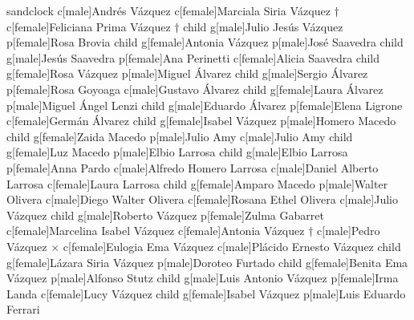 \documentclass{standalone}
\begin{document}
\begin{genealogypicture}
sandclock{%
    c[male]{Andrés Vázquez}
    c[female]{Marciala Siria Vázquez $\dagger$}
    c[female]{Feliciana Prima Vázquez $\dagger$}
    child{%
        g[male]{Julio Jesús Vázquez}
        p[female]{Rosa Brovia}
        child{%
            g[female]{Antonia Vázquez}
            p[male]{José Saavedra}
            child{%
                g[male]{Jesús Saavedra}
                p[female]{Ana Perinetti}
                c[female]{Alicia Saavedra}
            }
        }
        child{%
            g[female]{Rosa Vázquez}
            p[male]{Miguel Álvarez}
            child{%
                g[male]{Sergio Álvarez}
                p[female]{Rosa Goyoaga}
                c[male]{Gustavo Álvarez}
                child{%
                    g[female]{Laura Álvarez}
                    p[male]{Miguel Ángel Lenzi}
                }
            }
            child{%
                g[male]{Eduardo Álvarez}
                p[female]{Elena Ligrone}
                c[female]{Germán Álvarez}
            }
        }
        child{%
            g[female]{Isabel Vázquez}
            p[male]{Homero Macedo}
            child{%
                g[female]{Zaida Macedo}
                p[male]{Julio Amy}
                c[male]{Julio Amy}
            }
            child{%
                g[female]{Luz Macedo}
                p[male]{Elbio Larrosa}
                child{%
                    g[male]{Elbio Larrosa}
                    p[female]{Anna Pardo}
                }
                c[male]{Alfredo Homero Larrosa}
                c[male]{Daniel Alberto Larrosa}
                c[female]{Laura Larrosa}
            }
            child{%
                g[female]{Amparo Macedo}
                p[male]{Walter Olivera}
                c[male]{Diego Walter Olivera}
                c[female]{Rosana Ethel Olivera}
            }
        }
        c[male]{Julio Vázquez}
        child{%
            g[male]{Roberto Vázquez}
            p[female]{Zulma Gabarret}
        }
    }
    c[female]{Marcelina Isabel Vázquez}
    c[female]{Antonia Vázquez $\dagger$}
    c[male]{Pedro Vázquez $\times$}
    c[female]{Eulogia Ema Vázquez}
    c[male]{Plácido Ernesto Vázquez}
    child{%
        g[female]{Lázara Siria Vázquez}
        p[male]{Doroteo Furtado}
    }
    child{%
        g[female]{Benita Ema Vázquez}
        p[male]{Alfonso Stutz}
    }
    child{%
        g[male]{Luis Antonio Vázquez}
        p[female]{Irma Landa}
        c[female]{Lucy Vázquez}
        child{%
            g[female]{Isabel Vázquez}
            p[male]{Luis Eduardo Ferrari}
}}}
\end{genealogypicture}
\end{document}
